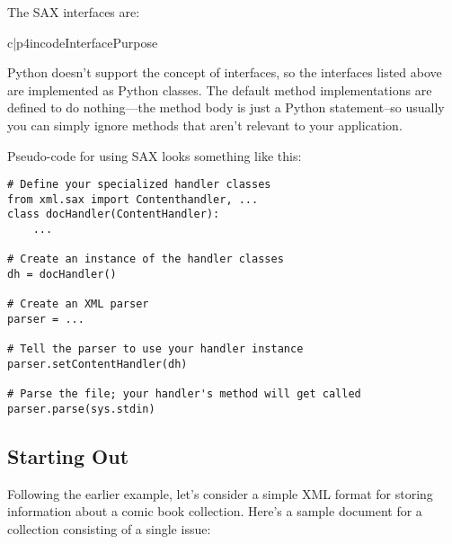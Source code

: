 \documentclass{howto}
\begin{document}
The SAX interfaces are:

\begin{tableii}{c|p{4in}}{code}{Interface}{Purpose}





\end{tableii}

Python doesn't support the concept of interfaces, so the interfaces
listed above are implemented as Python classes.  The default method
implementations are defined to do nothing---the method body is just a
Python  statement--so usually you can simply ignore methods
that aren't relevant to your application. 

Pseudo-code for using SAX looks something like this:
\begin{verbatim}
# Define your specialized handler classes
from xml.sax import Contenthandler, ...
class docHandler(ContentHandler):
    ...

# Create an instance of the handler classes
dh = docHandler()

# Create an XML parser
parser = ...

# Tell the parser to use your handler instance
parser.setContentHandler(dh)

# Parse the file; your handler's method will get called
parser.parse(sys.stdin)

\end{verbatim}

\subsection{Starting Out}

Following the earlier example, let's consider a simple XML format for
storing information about a comic book collection.  Here's a sample
document for a collection consisting of a single issue:
\end{document}
